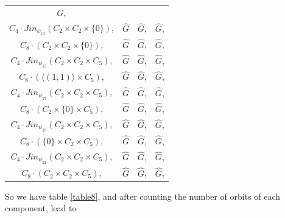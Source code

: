 \documentclass{article}
\begin{document}
\begin{table}
\begin{tabular}{cccc}
     $\hat{G} $,  \\
     $C_{4} \cdot Jin_{\psi_{13}}(C_2 \times C_2 \times \{0\} ) $,   &
 $\hat{G}$  &
     $\hat{G} $,   &
     $\hat{G} $,  \\
     $C_{8} \cdot(C_2 \times C_2 \times \{0\} ) $,   &
 $\hat{G}$  &
     $\hat{G} $,   &
     $\hat{G} $,  \\
     $C_{4} \cdot Jin_{\psi_{15}}(C_2 \times C_2 \times C_5) $,   &
 $\hat{G}$  &
     $\hat{G} $,   &
     $\hat{G} $,  \\
     $C_{8} \cdot(\langle (1,1) \rangle \times C_5) $,   &
 $\hat{G}$  &
     $\hat{G} $,   &
     $\hat{G} $,  \\
     $C_{4} \cdot Jin_{\psi_{17}}(C_2 \times C_2 \times C_5) $,   &
 $\hat{G}$  &
     $\hat{G} $,   &
     $\hat{G} $,  \\
     $C_{8} \cdot(C_2 \times \{0\}  \times C_5) $,   &
 $\hat{G}$  &
     $\hat{G} $,   &
     $\hat{G} $,  \\
     $C_{4} \cdot Jin_{\psi_{19}}(C_2 \times C_2 \times C_5) $,   &
 $\hat{G}$  &
     $\hat{G} $,   &
     $\hat{G} $,  \\
     $C_{8} \cdot (\{0\} \times C_2 \times C_5) $,   &
 $\hat{G}$  &
     $\hat{G} $,   &
     $\hat{G} $,  \\
     $C_{4} \cdot Jin_{\psi_{21}}(C_2 \times C_2 \times C_5) $,   &
 $\hat{G}$  &
     $\hat{G} $,   &
     $\hat{G} $,  \\
     $C_{8} \cdot (C_2 \times C_2 \times C_5) $,   &
 $\hat{G}$  &
     $\hat{G} $,   &
     $\hat{G} $,  \\
     \bottomrule
 \end{tabular}
\end{table}

So we have table \ref{table8}, and after counting the number of orbits of each component, lead to
\end{document}
